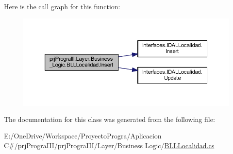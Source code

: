 Here is the call graph for this function\+:
\nopagebreak
\begin{figure}[H]
\begin{center}
\leavevmode
\includegraphics[width=350pt]{classprj_progra_i_i_i_1_1_layer_1_1_business___logic_1_1_b_l_l_localidad_a4c0ae52352d4acd717e66a511e667350_cgraph}
\end{center}
\end{figure}


The documentation for this class was generated from the following file\+:\begin{DoxyCompactItemize}
\item 
E\+:/\+One\+Drive/\+Workspace/\+Proyecto\+Progra/\+Aplicacion C\#/prj\+Progra\+I\+I\+I/prj\+Progra\+I\+I\+I/\+Layer/\+Business Logic/\hyperlink{_b_l_l_localidad_8cs}{B\+L\+L\+Localidad.\+cs}\end{DoxyCompactItemize}
